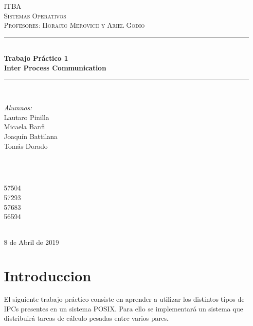 \documentclass[12pt]{article}
\begin{document}
\begin{titlepage}
\newcommand{\HRule}{\rule{\linewidth}{0.5mm}} 
\center 

\textsc{\LARGE ITBA}\\[1.5cm] 
\textsc{\Large Sistemas Operativos}\\[0.5cm] 
\textsc{\large Profesores: Horacio Merovich y Ariel Godio}\\[0.5cm] 

\HRule \\[0.4cm]
{ \huge \bfseries Trabajo Pr\'actico 1 \\ Inter Process Communication }\\[0.4cm] 
\HRule \\[1.5cm]
 
\begin{minipage}{0.4\textwidth}
\begin{flushleft} \large
\emph{Alumnos:}\\
Lautaro Pinilla \\
Micaela Banfi \\
Joaqu\'in Battilana \\
Tom\'as Dorado \\
\end{flushleft}
\end{minipage}
~
\begin{minipage}{0.4\textwidth}
\begin{flushright} \large
\emph{} \\
57504 \\
57293 \\
57683 \\
56594 \\
\end{flushright}
\end{minipage}\\[2cm]


{\large 8 de Abril de 2019}\\[2cm]


\vfil
\end{titlepage}

\section{Introduccion}
El siguiente trabajo práctico consiste en aprender a utilizar los distintos tipos de IPCs presentes en un sistema POSIX. Para ello se implementará un sistema que distribuirá tareas de cálculo pesadas entre varios pares.
\end{document}
